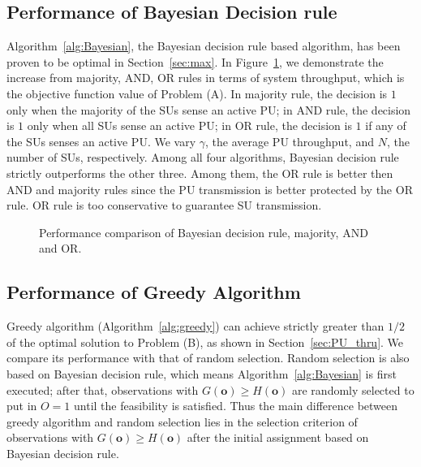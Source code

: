 \documentclass[conference]{IEEEtran}
\begin{document}
\subsection{Performance of Bayesian Decision rule}
\label{subsec:A}

Algorithm~\ref{alg:Bayesian}, the Bayesian decision rule based algorithm, has been proven to be optimal in Section~\ref{sec:max}. In Figure~\ref{fig:all4}, we demonstrate the increase from majority, AND, OR rules in terms of system throughput, which is the objective function value of Problem (A). In majority rule, the decision is $1$ only when the majority of the SUs sense an active PU; in AND rule, the decision is $1$ only when all SUs sense an active PU; in OR rule, the decision is $1$ if any of the SUs senses an active PU. We vary $\gamma$, the average PU throughput, and $N$, the number of SUs, respectively. Among all four algorithms, Bayesian decision rule strictly outperforms the other three. Among them, the OR rule is better then AND and majority rules since the PU transmission is better protected by the OR rule. OR rule is too conservative to guarantee SU transmission.  

\begin{figure}[!t]
\centering
{}
\hfil
{}
\vspace{-0.5em}
\caption{Performance comparison of Bayesian decision rule, majority, AND and OR.}
\vspace{-1.5em}
\label{fig:all4}
\end{figure}

\subsection{Performance of Greedy Algorithm}
\label{subsec:B}

Greedy algorithm (Algorithm~\ref{alg:greedy}) can achieve strictly greater than $1/2$ of the optimal solution to Problem (B), as shown in Section~\ref{sec:PU_thru}. We compare its performance with that of random selection. Random selection is also based on Bayesian decision rule, which means Algorithm~\ref{alg:Bayesian} is first executed; after that, observations with $G(\boldsymbol{o})\ge H(\boldsymbol{o})$ are randomly selected to put in $O=1$ until the feasibility is satisfied. Thus the main difference between greedy algorithm and random selection lies in the selection criterion of observations with $G(\boldsymbol{o})\ge H(\boldsymbol{o})$ after the initial assignment based on Bayesian decision rule.  
\end{document}
